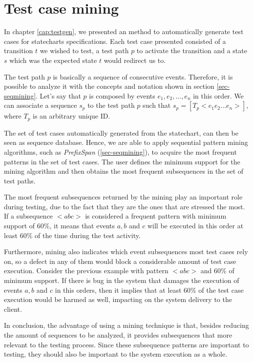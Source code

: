 \section{Test case mining}
\label{sec-testsequence}

In chapter \ref{cap:testgen}, we presented an method to automatically generate test cases for statecharts specifications. Each test case presented consisted of a transition $t$ we wished to test, a test path $p$ to activate the transition and a state $s$ which was the expected state $t$ would redirect us to.

The test path $p$ is basically a sequence of consecutive events. Therefore, it is possible to analyze it with the concepts and notation shown in section \ref{sec-seqmining}. Let's say that $p$ is composed by events $e_1,e_2,...,e_n$ in this order. We can associate a sequence $s_p$ to the test path $p$ such that $s_p = [T_p < e_1e_2...e_n >]$, where $T_p$ is an arbitrary unique ID.


The set of test cases automatically generated from the statechart, can then be seen as sequence database. Hence, we are able to apply sequential pattern mining algorithms, such as \textit{PrefixSpan} (\ref{sec-seqmining}), to acquire the most frequent patterns in the set of test cases. The user defines the minimum support for the mining algorithm and then obtains the most frequent subsequences in the set of test paths.

The most frequent subsequences returned by the mining play an important role during testing, due to the fact that they are the ones that are stressed the most. If a subsequence $< a b c >$ is considered a frequent pattern with minimum support of $60\%$, it means that events $a, b$ and $c$ will be executed in this order at least $60\%$ of the time during the test activity.

Furthermore, mining also indicates which event subsequences most test cases rely on, so a defect in any of them would block a considerable amount of test case execution. Consider the previous example with pattern $< a b c >$ and $60\%$ of minimum support. If there is bug in the system that damages the execution of events $a, b$ and $c$ in this orders, then it implies that at least $60\%$ of the test case execution would be harmed as well, impacting on the system delivery to the client.

In conclusion, the advantage of using a mining technique is that, besides reducing the amount of sequences to be analyzed, it provides subsequences that more relevant to the testing process. Since these subsequence patterns are important to testing, they should also be important to the system execution as a whole. 





